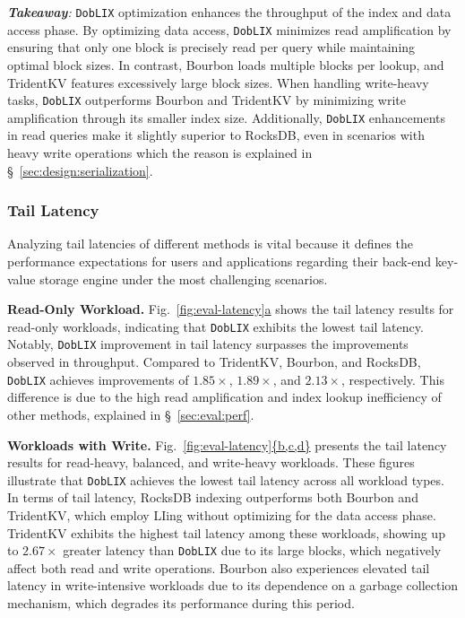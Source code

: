 \vspace{1pt}
\noindent\textit{\small\textbf{Takeaway}:} \texttt{DobLIX} optimization enhances the throughput of the index and data access phase. By optimizing data access, \texttt{DobLIX} minimizes read amplification by ensuring that only one block is precisely read per query while maintaining optimal block sizes. In contrast, Bourbon loads multiple blocks per lookup, and TridentKV features excessively large block sizes. When handling write-heavy tasks, \texttt{DobLIX} outperforms Bourbon and TridentKV by minimizing write amplification through its smaller index size. Additionally, \texttt{DobLIX} enhancements in read queries make it slightly superior to RocksDB, even in scenarios with heavy write operations which the reason is explained in \S~\ref{sec:design:serialization}.


\subsubsection{\textbf{Tail Latency}} 
\label{sec:eval:tail}
Analyzing tail latencies of different methods is vital because it defines the performance expectations for users and applications regarding their back-end key-value storage engine under the most challenging scenarios.

\noindent
{\small\textbf{Read-Only Workload.}}
Fig.~\hyperref[fig:eval-latency]{\ref*{fig:eval-latency}a} shows the tail latency results for read-only workloads, indicating that \texttt{DobLIX} exhibits the lowest tail latency. Notably, \texttt{DobLIX} improvement in tail latency surpasses the improvements observed in throughput. Compared to TridentKV, Bourbon, and RocksDB, \texttt{DobLIX} achieves improvements of $1.85\times$, $1.89\times$, and $2.13\times$, respectively. This difference is due to the high read amplification and index lookup inefficiency of other methods, explained in \S~\ref{sec:eval:perf}.

\noindent
{\small\textbf{Workloads with Write.}} Fig.~\hyperref[fig:eval-latency]{\ref*{fig:eval-latency}\{b,c,d\}} presents the tail latency results for read-heavy, balanced, and write-heavy workloads. These figures illustrate that \texttt{DobLIX} achieves the lowest tail latency across all workload types. In terms of tail latency, RocksDB indexing outperforms both Bourbon and TridentKV, which employ LIing without optimizing for the data access phase. TridentKV exhibits the highest tail latency among these workloads, showing up to $2.67\times$ greater latency than \texttt{DobLIX} due to its large blocks, which negatively affect both read and write operations. Bourbon also experiences elevated tail latency in write-intensive workloads due to its dependence on a garbage collection mechanism\cite{Bourbon2020}, which degrades its performance during this period.


